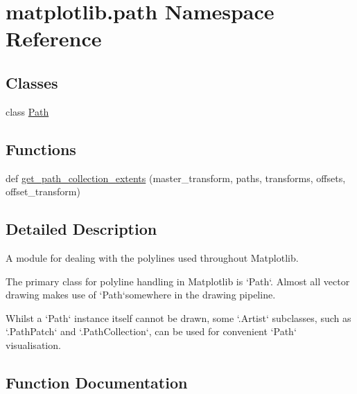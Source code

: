 \hypertarget{namespacematplotlib_1_1path}{}\section{matplotlib.\+path Namespace Reference}
\label{namespacematplotlib_1_1path}
\subsection*{Classes}
\begin{DoxyCompactItemize}
\item 
class \hyperlink{classmatplotlib_1_1path_1_1Path}{Path}
\end{DoxyCompactItemize}
\subsection*{Functions}
\begin{DoxyCompactItemize}
\item 
def \hyperlink{namespacematplotlib_1_1path_a61ed537b00e7dc6ef9813160d68b0ee2}{get\+\_\+path\+\_\+collection\+\_\+extents} (master\+\_\+transform, paths, transforms, offsets, offset\+\_\+transform)
\end{DoxyCompactItemize}


\subsection{Detailed Description}
\begin{DoxyVerb}A module for dealing with the polylines used throughout Matplotlib.

The primary class for polyline handling in Matplotlib is `Path`.  Almost all
vector drawing makes use of `Path`\s somewhere in the drawing pipeline.

Whilst a `Path` instance itself cannot be drawn, some `.Artist` subclasses,
such as `.PathPatch` and `.PathCollection`, can be used for convenient `Path`
visualisation.
\end{DoxyVerb}
 

\subsection{Function Documentation}
\mbox{\label{namespacematplotlib_1_1path_a61ed537b00e7dc6ef9813160d68b0ee2}} 
